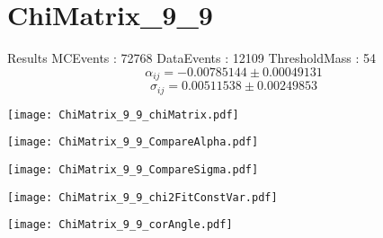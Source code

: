 \documentclass[a4paper,12pt]{article}
\begin{document}
\section{ChiMatrix\_9\_9}
\begin{minipage}{0.49\linewidth} Results \newline
MCEvents : 72768\newline
DataEvents : 12109 \newline
ThresholdMass : 54\\
$$\alpha_{ij} = -0.00785144\pm 0.00049131$$
$$\sigma_{ij} = 0.00511538\pm 0.00249853$$
\end{minipage}\hfill
\begin{minipage}{0.49\linewidth} 
\texttt{[image: ChiMatrix\_9\_9\_chiMatrix.pdf]}\\
\end{minipage}
\hfill
\begin{minipage}{0.49\linewidth} 
\texttt{[image: ChiMatrix\_9\_9\_CompareAlpha.pdf]}\\
\end{minipage}
\hfill
\begin{minipage}{0.49\linewidth} 
\texttt{[image: ChiMatrix\_9\_9\_CompareSigma.pdf]}\\
\end{minipage}
\begin{minipage}{0.49\linewidth} 
\texttt{[image: ChiMatrix\_9\_9\_chi2FitConstVar.pdf]}\\
\end{minipage}
\hfill
\begin{minipage}{0.49\linewidth} 
\texttt{[image: ChiMatrix\_9\_9\_corAngle.pdf]}\\
\end{minipage}
\end{document}
